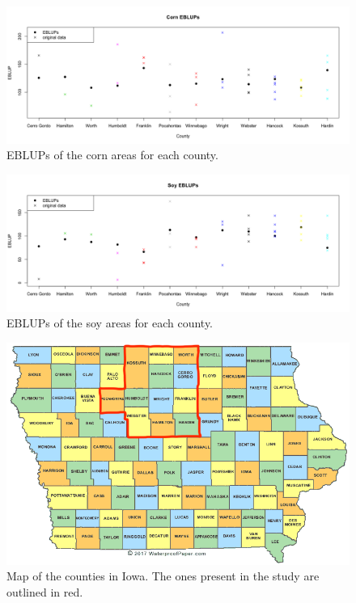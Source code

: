 \documentclass{article}
\begin{document}
\begin{figure}[H]
	\centering
	\includegraphics[scale=0.4]{cornEBLUPs}
	\caption{EBLUPs of the corn areas for each county.}
	\label{cornEBLUPs}
\end{figure}

\begin{figure}[H]
	\centering
	\includegraphics[scale=0.4]{soyEBLUPs}
	\caption{EBLUPs of the soy areas for each county.}
	\label{soyEBLUPs}
\end{figure}

\begin{figure}[H]
	\centering
	\includegraphics[scale=0.4]{iowacounties}
	\caption{Map of the counties in Iowa. The ones present in the study are outlined in red.}
	\label{IowaCounties}
\end{figure}
\end{document}
